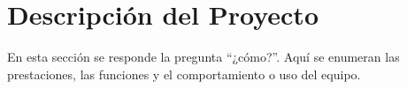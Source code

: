 \section{Descripción del Proyecto}
    En esta sección se responde la pregunta “¿cómo?”. Aquí se enumeran las
    prestaciones, las funciones y el comportamiento o uso del equipo.



